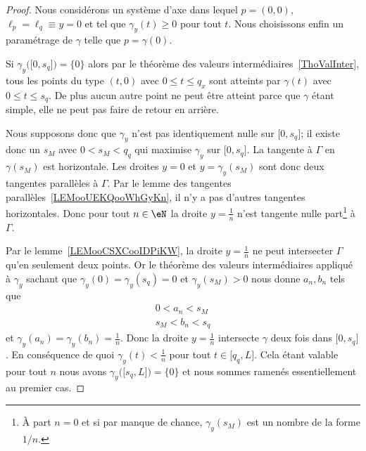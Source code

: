 \begin{proof}
	Nous considérons un système d'axe dans lequel \( p=(0,0)\), \( \ell_p=\ell_q\equiv y=0\) et tel que \( \gamma_y(t)\geq 0\) pour tout \( t\). Nous choisissons enfin un paramétrage de \( \gamma\) telle que \( p=\gamma(0)\).

	Si \( \gamma_y\big( \mathopen[ 0 , s_q \mathclose] \big)=\{ 0 \}\) alors par le théorème des valeurs intermédiaires~\ref{ThoValInter}, tous les points du type \( (t,0)\) avec \( 0\leq t\leq q_x\) sont atteints par \(  \gamma(t)   \) avec \( 0\leq t\leq s_q\). De plus aucun autre point ne peut être atteint parce que \( \gamma\) étant simple, elle ne peut pas faire de retour en arrière.

	Nous supposons donc que \( \gamma_y\) n'est pas identiquement nulle sur \( \mathopen[ 0 , s_q \mathclose]\); il existe donc un \( s_M\) avec  \( 0<s_M<q_q\) qui maximise \( \gamma_y\) sur \( \mathopen[ 0 , s_q \mathclose]\). La tangente à \( \Gamma\) en \( \gamma(s_M)\) est horizontale. Les droites \( y=0\) et \( y=\gamma_y(s_M)\) sont donc deux tangentes parallèles à \( \Gamma\). Par le lemme des tangentes parallèles~\ref{LEMooUEKQooWhGyKn}, il n'y a pas d'autres tangentes horizontales. Donc pour tout \( n\in \eN\) la droite \( y=\frac{1}{ n }\) n'est tangente nulle part\footnote{À part \( n=0\) et si par manque de chance, \( \gamma_y(s_M) \) est un nombre de la forme \( 1/n\).} à \( \Gamma\).

	Par le lemme~\ref{LEMooCSXCooIDPiKW}, la droite \( y=\frac{1}{ n }\) ne peut intersecter \( \Gamma\) qu'en seulement deux points. Or le théorème des valeurs intermédiaires appliqué à \( \gamma_y\) sachant que \( \gamma_y(0)=\gamma_y(s_q)=0\) et \( \gamma_y(s_M)>0\) nous donne \( a_n,b_n\) tels que
	\begin{subequations}
		\begin{align}
			0<a_n<s_M \\
			s_M<b_n<s_q
		\end{align}
	\end{subequations}
	et \( \gamma_y(a_n)=\gamma_y(b_n)=\frac{1}{ n }\). Donc la droite \( y=\frac{1}{ n }\) intersecte \( \gamma\) deux fois dans \( \mathopen[ 0 , s_q \mathclose]\). En conséquence de quoi \( \gamma_y(t)<\frac{1}{ n }\) pour tout \( t\in\mathopen[ q_q , L \mathclose]\). Cela étant valable pour tout \( n\) nous avons \( \gamma_y\big( \mathopen[ s_q , L \mathclose] \big)=\{ 0 \}\) et nous sommes ramenés essentiellement au premier cas.
\end{proof}


